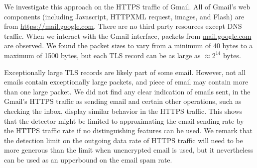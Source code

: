 We investigate this approach on the HTTPS traffic of Gmail. 
All of Gmail's web components (including Javascript, HTTPXML request,
images, and Flash) are from \url{https://mail.google.com}.
There are no third party resources except DNS traffic.
When we interact with the Gmail interface, packets from \url{mail.google.com} are observed.
We found the packet sizes to
vary from a minimum of 40 bytes to a maximum of 1500 bytes,
but each TLS record can be as large as $\approx 2^{14}$ bytes. 

Exceptionally large TLS records are likely part of some email.
However, not all emails contain exceptionally large packets, and piece
of email may contain more than one large packet. 
We did not find any clear indication of emails sent, in the
Gmail's HTTPS traffic as
sending email and certain other operations, such as checking the inbox,
display similar behavior in the HTTPS traffic.
This shows that the detector might be limited to approximating
the email sending rate by the HTTPS traffic rate if no distinguishing
features can be used.
We remark that the detection limit on the outgoing data rate of 
HTTPS traffic will need to be more generous than the limit when 
unencrypted email is used, 
but it nevertheless can be used as an upperbound on the email spam rate.
